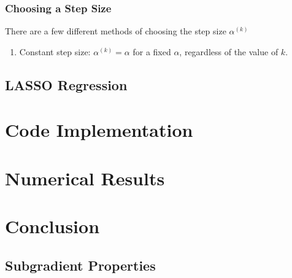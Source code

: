 \documentclass[conference]{IEEEtran}
\begin{document}
\subsubsection{Choosing a Step Size}
There are a few different methods of choosing the step size \(\alpha^{(k)}\)
\begin{enumerate}
    \item Constant step size: \(\alpha^{(k)} = \alpha\) for a fixed \(\alpha\), regardless of the value of \(k\).
\end{enumerate}

\subsection{LASSO Regression}\label{sec:math lasso}

\section{Code Implementation}\label{sec:code}

\section{Numerical Results}\label{sec:results}

\section{Conclusion}\label{sec:conclusion}

\appendix
\subsection{Subgradient Properties}\label{sec:subgradient properties proofs}
\end{document}
